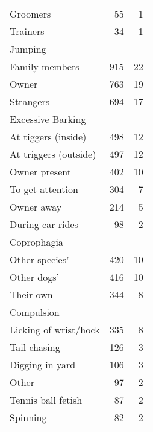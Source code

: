 \documentclass[varwidth=\maxdimen]{standalone}
\newcommand{\subrow}[1]{\hspace{1.25em}#1}
\begin{document}
\begin{tabular}[t]{lrr}
  \subrow{Groomers}                            &       55 &               1 \\
  \subrow{Trainers}                            &       34 &               1 \\
Jumping \\
  \subrow{Family members}                      &      915 &              22 \\
  \subrow{Owner}                               &      763 &              19 \\
  \subrow{Strangers}                           &      694 &              17 \\
Excessive Barking \\
  \subrow{At tiggers (inside)}                 &      498 &              12 \\
  \subrow{At triggers (outside)}               &      497 &              12 \\
  \subrow{Owner present}                       &      402 &              10 \\
  \subrow{To get attention}                    &      304 &               7 \\
  \subrow{Owner away}                          &      214 &               5 \\
  \subrow{During car rides}                    &       98 &               2 \\
Coprophagia \\
  \subrow{Other species'}                      &      420 &              10 \\
  \subrow{Other dogs'}                         &      416 &              10 \\
  \subrow{Their own}                           &      344 &               8 \\
Compulsion \\
  \subrow{Licking of wrist/hock}               &      335 &               8 \\
  \subrow{Tail chasing}                        &      126 &               3 \\
  \subrow{Digging in yard}                     &      106 &               3 \\
  \subrow{Other}                               &       97 &               2 \\
  \subrow{Tennis ball fetish}                  &       87 &               2 \\
  \subrow{Spinning}                            &       82 &               2 \\

\end{tabular}
\end{document}
